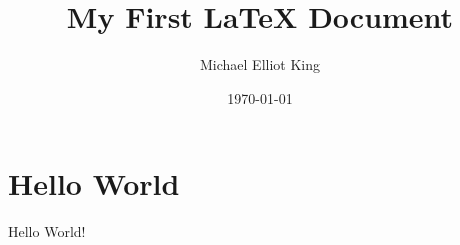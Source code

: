 \documentclass[12pt, letterpaper]{article}
\title{My First \LaTeX{} Document}
\author{Michael Elliot King}
\date{\today}
\begin{document}
\maketitle

\section{Hello World}

	Hello World!
\end{document}
